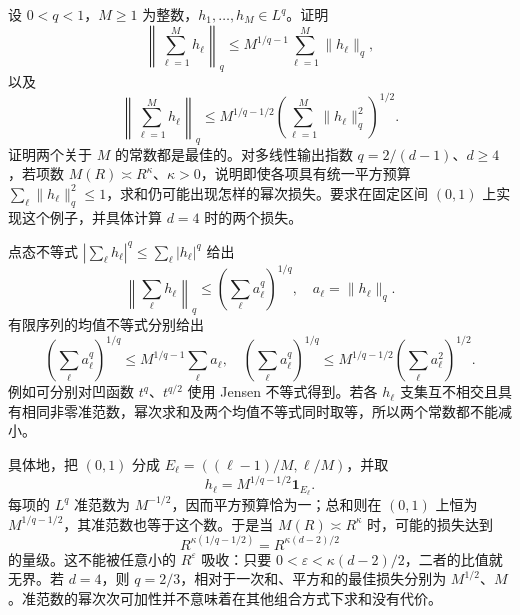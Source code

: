 \begin{optionalexercise}\label{b2:ex:25-new-6}
设 \(0<q<1\)，\(M\geq1\) 为整数，\(h_1,\ldots,h_M\in L^q\)。证明
\[
 \left\|\sum_{\ell=1}^M h_\ell\right\|_q
 \leq M^{1/q-1}\sum_{\ell=1}^M\|h_\ell\|_q,
\]
以及
\[
 \left\|\sum_{\ell=1}^M h_\ell\right\|_q
 \leq M^{1/q-1/2}
       \left(\sum_{\ell=1}^M\|h_\ell\|_q^2\right)^{1/2}.
\]
证明两个关于 \(M\) 的常数都是最佳的。对多线性输出指数
\(q=2/(d-1)\)、\(d\geq4\)，若项数 \(M(R)\asymp R^\kappa\)、\(\kappa>0\)，说明即使各项具有统一平方预算
\(\sum_\ell\|h_\ell\|_q^2\leq1\)，求和仍可能出现怎样的幂次损失。要求在固定区间 \((0,1)\) 上实现这个例子，并具体计算 \(d=4\) 时的两个损失。
\end{optionalexercise}
\begin{solution}
点态不等式 \(|\sum_\ell h_\ell|^q\leq\sum_\ell|h_\ell|^q\) 给出
\[
 \left\|\sum_\ell h_\ell\right\|_q
       \leq\left(\sum_\ell a_\ell^q\right)^{1/q},
 \quad a_\ell=\|h_\ell\|_q.
\]
有限序列的均值不等式分别给出
\[
 \left(\sum_\ell a_\ell^q\right)^{1/q}
       \leq M^{1/q-1}\sum_\ell a_\ell,
 \quad
 \left(\sum_\ell a_\ell^q\right)^{1/q}
       \leq M^{1/q-1/2}
             \left(\sum_\ell a_\ell^2\right)^{1/2}.
\]
例如可分别对凹函数 \(t^q\)、\(t^{q/2}\) 使用 Jensen 不等式得到。若各 \(h_\ell\) 支集互不相交且具有相同非零准范数，幂次求和及两个均值不等式同时取等，所以两个常数都不能减小。

具体地，把 \((0,1)\) 分成
\(E_\ell=((\ell-1)/M,\ell/M)\)，并取
\[
 h_\ell=M^{1/q-1/2}\mathbf1_{E_\ell}.
\]
每项的 \(L^q\) 准范数为 \(M^{-1/2}\)，因而平方预算恰为一；总和则在 \((0,1)\) 上恒为 \(M^{1/q-1/2}\)，其准范数也等于这个数。于是当 \(M(R)\asymp R^\kappa\) 时，可能的损失达到
\[
 R^{\kappa(1/q-1/2)}
       =R^{\kappa(d-2)/2}
\]
的量级。这不能被任意小的 \(R^\varepsilon\) 吸收：只要
\(0<\varepsilon<\kappa(d-2)/2\)，二者的比值就无界。若 \(d=4\)，则 \(q=2/3\)，相对于一次和、平方和的最佳损失分别为 \(M^{1/2}\)、\(M\)。准范数的幂次次可加性并不意味着在其他组合方式下求和没有代价。
\end{solution}

